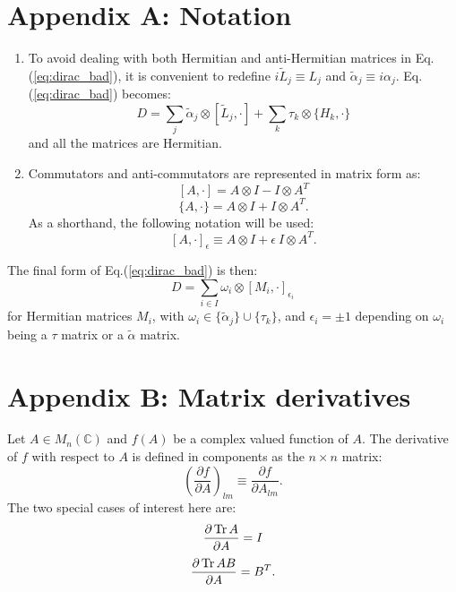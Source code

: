 \section*{Appendix A: Notation}
\begin{enumerate}
\item To avoid dealing with both Hermitian and anti-Hermitian matrices in Eq.(\ref{eq:dirac_bad}), it is convenient to redefine $i \tilde{L}_j \equiv L_j$ and $\tilde{\alpha}_j \equiv i \alpha_j$. Eq.(\ref{eq:dirac_bad}) becomes:
\begin{equation}
D = \sum_j \tilde{\alpha}_j \otimes [\tilde{L}_j, \cdot ] + \sum_k \tau_k \otimes \{H_k, \cdot \}
\end{equation}
and all the matrices are Hermitian.
\item Commutators and anti-commutators are represented in matrix form as:
$$[A, \cdot ] = A \otimes I - I \otimes A^T$$
$$\{A, \cdot \} = A \otimes I + I \otimes A^T.$$
As a shorthand, the following notation will be used:
$$[A, \cdot ]_{\epsilon} \equiv A \otimes I + \epsilon \ I \otimes A^T.$$
\end{enumerate}
The final form of Eq.(\ref{eq:dirac_bad}) is then:
\begin{equation}\label{eq:dirac}
D = \sum_{i \in I} \omega_i \otimes [ M_i, \cdot ]_{\epsilon_i}
\end{equation}
for Hermitian matrices $M_i$, with $\omega_i \in \{ \tilde{\alpha}_j \} \cup \{ \tau_k \}$, and $\epsilon_i = \pm 1$ depending on $\omega_i$ being a $\tau$ matrix or a $\tilde{\alpha}$ matrix.

\section*{Appendix B: Matrix derivatives} \label{sec:matder}
Let $A \in M_n(\mathbb{C})$ and $f(A)$ be a complex valued function of $A$. The derivative of $f$ with respect to $A$ is defined in components as the $n \times n$ matrix:
\begin{equation}
\left(\frac{\partial f}{\partial A}\right)_{lm} \equiv \frac{\partial f}{\partial A_{lm}}.
\end{equation}
The two special cases of interest here are:
\begin{equation}
\frac{\partial \operatorname{Tr} A}{\partial A} = I
\end{equation}
\begin{equation}
\frac{\partial \operatorname{Tr} AB}{\partial A} = B^T.
\end{equation}

